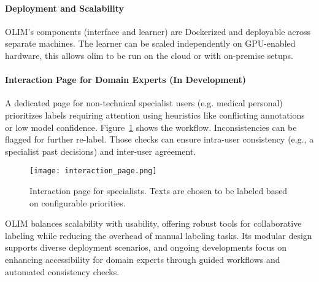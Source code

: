 \documentclass{article}
\begin{document}
\paragraph{Deployment and Scalability}  
OLIM’s components (interface and learner) are Dockerized and deployable across separate machines. The learner can be scaled independently on GPU-enabled hardware, this allows olim to be run on the cloud or with on-premise setups.

\paragraph{Interaction Page for Domain Experts (In Development)}  
A dedicated page for non-technical specialist users (e.g. medical personal) prioritizes labels requiring attention using heuristics like conflicting annotations or low model confidence. Figure~\ref{fig:interaction_page} shows the workflow. Inconsistencies can be flagged for further re-label. Those checks can ensure intra-user consistency (e.g., a specialist past decisions) and inter-user agreement.

\begin{figure}[ht]
    \centering
    \texttt{[image: interaction\_page.png]}
    \caption{Interaction page for specialists. Texts are chosen to be labeled based on configurable priorities.}
    \label{fig:interaction_page}
\end{figure}

OLIM balances scalability with usability, offering robust tools for collaborative labeling while reducing the overhead of manual labeling tasks. Its modular design supports diverse deployment scenarios, and ongoing developments focus on enhancing accessibility for domain experts through guided workflows and automated consistency checks.
\end{document}
